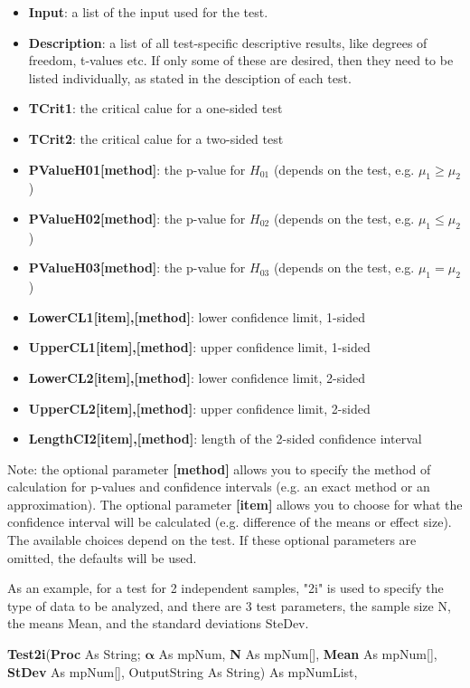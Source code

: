 \begin{itemize}
	\item \textbf{Input}: a list of the input used for the test.
	\item \textbf{Description}: a list of all test-specific descriptive results, like degrees of freedom, t-values etc. If only some of these are desired, then they need to be listed individually, as stated in the desciption of each test.
	\item \textbf{TCrit1}: the critical calue for a one-sided test
	\item \textbf{TCrit2}: the critical calue for a two-sided test
	\item \textbf{PValueH01[method]}: the p-value for $H_{01}$ (depends on the test, e.g. $\mu_1 \geq \mu_2$)
	\item \textbf{PValueH02[method]}: the p-value for $H_{02}$ (depends on the test, e.g. $\mu_1 \leq \mu_2$)
	\item \textbf{PValueH03[method]}: the p-value for $H_{03}$ (depends on the test, e.g. $\mu_1 = \mu_2$)
	\item \textbf{LowerCL1[item],[method]}: lower confidence limit, 1-sided
	\item \textbf{UpperCL1[item],[method]}: upper confidence limit, 1-sided
	\item \textbf{LowerCL2[item],[method]}: lower confidence limit, 2-sided
	\item \textbf{UpperCL2[item],[method]}: upper confidence limit, 2-sided
	\item \textbf{LengthCI2[item],[method]}: length of the 2-sided confidence interval  
\end{itemize}
Note: the optional parameter \textbf{[method]} allows you to specify the method of calculation for p-values and confidence intervals (e.g. an exact method or an approximation). The optional parameter \textbf{[item]} allows you to choose for what the confidence interval will be calculated (e.g. difference of the means or effect size). The available choices depend on the test. If these optional parameters are omitted, the defaults will be used.

\vspace{0.3cm}
As an example, for a test for 2 independent samples, "2i" is used to specify the type of data to be analyzed, and there are 3 test parameters, the sample size \textsf{N}, the means  \textsf{Mean}, and the standard deviations \textsf{SteDev}.

\vspace{0.3cm}
\textsf{\textbf{Test2i}(\textbf{Proc} As String; $\boldsymbol{\alpha}$ As mpNum, \textbf{N} As mpNum[], \textbf{Mean} As mpNum[],  \textbf{StDev} As mpNum[], OutputString As String) As mpNumList}, 

